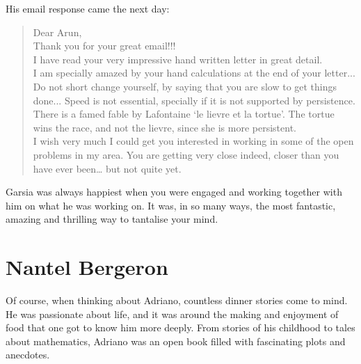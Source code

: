 \documentclass{notices}
\begin{document}
His email response came the next day:
\begin{quote}
Dear Arun,\\
Thank you for your great email!!!\\
I have read your very impressive hand written letter in great detail.\\
I am specially amazed by your hand calculations at the end of your letter...\\
Do not short change yourself, by saying that you are slow to get things done...
Speed is not essential, specially if it is not supported by persistence.
There is a famed fable by Lafontaine `le lievre et la tortue'.
The tortue wins the race, and not the lievre, since she is more persistent.\\
I wish very much I could get you interested in working in some of the open problems in my area.
You are getting very close indeed,
closer than you have ever been…
but not quite yet.
\end{quote}

Garsia was always happiest when you were engaged and working together with him on what he was working on.
It was, in so many ways, the most fantastic, amazing and thrilling way to tantalise your mind.

\section*{Nantel Bergeron}
Of course, when thinking about Adriano, countless dinner stories come to mind. He was passionate about life, and it was around the making and enjoyment of food that one got to know him more deeply. 
From stories of his childhood to tales about mathematics, Adriano was an open book filled with fascinating plots and anecdotes.
\end{document}
